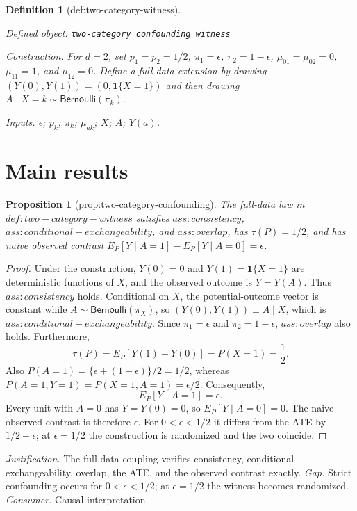 \documentclass{article}
\newtheorem{definition}{Definition}
\newtheorem{proposition}{Proposition}
\begin{document}
\begin{definition}[def:two-category-witness]\label{def:two-category-witness}
\par\smallskip\noindent\emph{Defined object.} \texttt{two-category confounding witness}
\par\smallskip\noindent\emph{Construction.} For \(d=2\), set \(p_1=p_2=1/2\), \(\pi_1=\epsilon\), \(\pi_2=1-\epsilon\), \(\mu_{01}=\mu_{02}=0\), \(\mu_{11}=1\), and \(\mu_{12}=0\). Define a full-data extension by drawing \((Y(0),Y(1))=(0,\mathbf 1\{X=1\})\) and then drawing \(A\mid X=k\sim\mathsf{Bernoulli}(\pi_k)\).
\par\smallskip\noindent\emph{Inputs.} \(\epsilon\); \(p_k\); \(\pi_k\); \(\mu_{ak}\); \(X\); \(A\); \(Y(a)\).
\end{definition}

\section{Main results}

\begin{proposition}[prop:two-category-confounding]\label{prop:two-category-confounding}
The full-data law in \(def:two-category-witness\) satisfies \(ass:consistency\), \(ass:conditional-exchangeability\), and \(ass:overlap\), has \(\tau(P)=1/2\), and has naive observed contrast \(E_P[Y\mid A=1]-E_P[Y\mid A=0]=\epsilon\).
\end{proposition}
\begin{proof}
Under the construction, \(Y(0)=0\) and \(Y(1)=\mathbf 1\{X=1\}\) are deterministic functions of \(X\), and the observed outcome is \(Y=Y(A)\). Thus \(ass:consistency\) holds. Conditional on \(X\), the potential-outcome vector is constant while \(A\sim\mathsf{Bernoulli}(\pi_X)\), so \((Y(0),Y(1))\perp A\mid X\), which is \(ass:conditional-exchangeability\). Since \(\pi_1=\epsilon\) and \(\pi_2=1-\epsilon\), \(ass:overlap\) also holds. Furthermore,
\[
\tau(P)=E_P[Y(1)-Y(0)]=P(X=1)=\frac12.
\tag{1}
\]
Also \(P(A=1)=\{\epsilon+(1-\epsilon)\}/2=1/2\), whereas \(P(A=1,Y=1)=P(X=1,A=1)=\epsilon/2\). Consequently,
\[
E_P[Y\mid A=1]=\epsilon.
\tag{2}
\]
Every unit with \(A=0\) has \(Y=Y(0)=0\), so \(E_P[Y\mid A=0]=0\). The naive observed contrast is therefore \(\epsilon\). For \(0<\epsilon<1/2\) it differs from the ATE by \(1/2-\epsilon\); at \(\epsilon=1/2\) the construction is randomized and the two coincide.
\end{proof}
\par\smallskip\noindent \textit{Justification.} The full-data coupling verifies consistency, conditional exchangeability, overlap, the ATE, and the observed contrast exactly. \textit{Gap.} Strict confounding occurs for \(0<\epsilon<1/2\); at \(\epsilon=1/2\) the witness becomes randomized. \textit{Consumer.} Causal interpretation.
\end{document}

